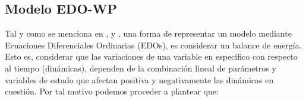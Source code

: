 \subsection{Modelo EDO-WP} \label{edosec}



Tal y como se menciona en \cite{shanks}, \cite{silvestre} y \cite{iran}, una forma de representar un modelo mediante Ecuaciones Diferenciales Ordinarias (EDOs), es considerar un balance de energía. Esto es, considerar que las variaciones de una variable en específico con respecto al tiempo (dinámicas), dependen de la combinación lineal de parámetros y variables de estado que afectan positiva y negativamente las dinámicas en cuestión. Por tal motivo podemos proceder a plantear que:

